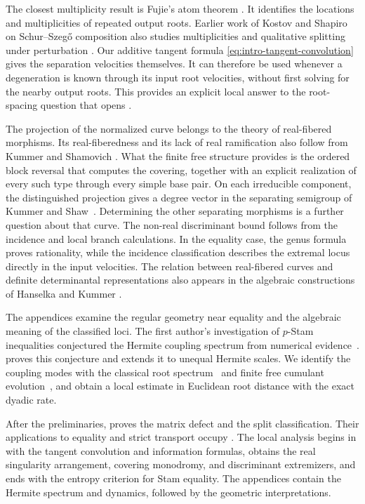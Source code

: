 \documentclass[12pt,reqno]{amsart}
\theoremstyle{definition}
\theoremstyle{remark}
\begin{document}
The closest multiplicity result is Fujie's atom theorem \cite[Theorem~1.1 and Propositions~3.6--3.8]{Fujie26}.  It identifies the
locations and multiplicities of repeated output roots.  Earlier work of
Kostov and Shapiro on Schur--Szeg\H{o} composition also studies
multiplicities and qualitative splitting under perturbation
\cite[Proposition~1.4 and Theorem~1.6]{KostovShapiro06}.  Our additive
tangent formula \eqref{eq:intro-tangent-convolution} gives the
separation velocities themselves.  It can therefore be used whenever
a degeneration is known through its input root velocities, without
first solving for the nearby output roots.  This provides an explicit
local answer to the root-spacing question that opens \cite{GVS26}.

The projection of the normalized curve belongs to the theory of
real-fibered morphisms.  Its real-fiberedness and its lack of real
ramification also follow from Kummer and Shamovich
\cite[Corollary~2.16 and Theorem~2.19]{KummerShamovich20}.
What the finite free structure provides is the ordered block reversal
that computes the covering, together with an explicit realization of
every such type through every simple base pair.  On each irreducible
component, the distinguished projection gives a degree vector in the
separating semigroup of Kummer and Shaw~\cite{KummerShaw20}.
Determining the other separating morphisms is a further question about
that curve. The non-real discriminant bound follows from the incidence and local branch calculations. In the equality case, the genus formula proves rationality, while the incidence classification describes the extremal locus directly in the input velocities. The relation between real-fibered curves and definite determinantal representations also appears in the algebraic constructions of
Hanselka and Kummer \cite[Corollaries~10.3--10.4]{HanselkaKummer24}.

The appendices examine the regular geometry near equality and the
algebraic meaning of the classified loci.  The first author's investigation of \(p\)-Stam inequalities conjectured the Hermite coupling spectrum from numerical evidence~\cite[Conjecture~4.1]{Hashemi26PStam}.
 proves this conjecture and extends it to
unequal Hermite scales.  We identify the coupling modes with the classical
root spectrum~\cite{Sasaki15} and finite free cumulant evolution~\cite{AP18}, and obtain a local estimate in Euclidean root distance with the exact dyadic rate. 

After the preliminaries,  proves the matrix
defect and the split classification.  Their applications to equality
and strict transport occupy
.
The local analysis begins in  with the
tangent convolution and information formulas,
 obtains the real singularity arrangement,
covering monodromy, and discriminant extremizers, and ends with the
entropy criterion for Stam equality.  The appendices contain the
Hermite spectrum and dynamics, followed by the geometric interpretations.
\end{document}
